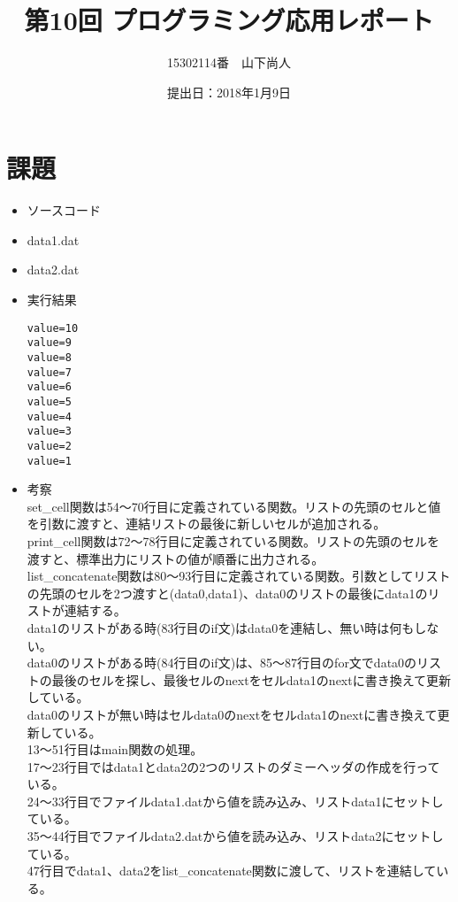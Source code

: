\documentclass[a4paper]{jsarticle}
\title{第10回 プログラミング応用レポート}
\author{15302114番　山下尚人}
\date{提出日：2018年1月9日}
\begin{document}
\maketitle%

\section*{課題}
	\begin{itemize}
	\item ソースコード
		 
		\mbox{}\newline
	\item data1.dat
		 
		\mbox{}\newline
	\item data2.dat
		 
		\mbox{}\newline
	\item 実行結果
		\begin{lstlisting}
value=10
value=9
value=8
value=7
value=6
value=5
value=4
value=3
value=2
value=1
		\end{lstlisting}
		\mbox{}\newpage
	\item 考察\mbox{}\\
		set\_cell関数は54〜70行目に定義されている関数。リストの先頭のセルと値を引数に渡すと、連結リストの最後に新しいセルが追加される。\\
		
		print\_cell関数は72〜78行目に定義されている関数。リストの先頭のセルを渡すと、標準出力にリストの値が順番に出力される。\\
		
		list\_concatenate関数は80〜93行目に定義されている関数。引数としてリストの先頭のセルを2つ渡すと(data0,data1)、data0のリストの最後にdata1のリストが連結する。\\
		data1のリストがある時(83行目のif文)はdata0を連結し、無い時は何もしない。\\
		data0のリストがある時(84行目のif文)は、85〜87行目のfor文でdata0のリストの最後のセルを探し、最後セルのnextをセルdata1のnextに書き換えて更新している。\\
		data0のリストが無い時はセルdata0のnextをセルdata1のnextに書き換えて更新している。\\
		
		13〜51行目はmain関数の処理。\\
		17〜23行目ではdata1とdata2の2つのリストのダミーヘッダの作成を行っている。\\
		24〜33行目でファイルdata1.datから値を読み込み、リストdata1にセットしている。\\
		35〜44行目でファイルdata2.datから値を読み込み、リストdata2にセットしている。\\
		47行目でdata1、data2をlist\_concatenate関数に渡して、リストを連結している。
	\end{itemize}
\end{document}
